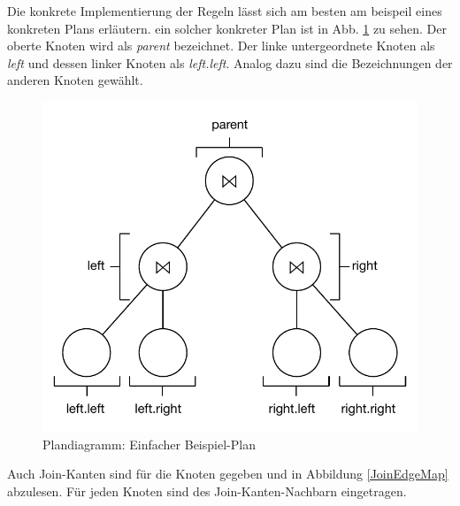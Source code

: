 Die konkrete Implementierung der Regeln lässt sich am besten am beispeil eines konkreten Plans erläutern. ein solcher konkreter Plan ist in Abb. \ref{SimplePlan} zu sehen. Der oberte Knoten wird als \textit{parent} bezeichnet. Der linke untergeordnete Knoten als \textit{left} und dessen linker Knoten als \textit{left.left}. Analog dazu sind die Bezeichnungen der anderen Knoten gewählt. 

\begin{figure}[ht]
  \centering
  \includegraphics{04_Implementierung/00_media/Plan.pdf}
  \caption{Plandiagramm: Einfacher Beispiel-Plan}
  \label{SimplePlan}
\end{figure}

Auch Join-Kanten sind für die Knoten gegeben und in Abbildung \ref{JoinEdgeMap} abzulesen. Für jeden Knoten sind des Join-Kanten-Nachbarn eingetragen.
